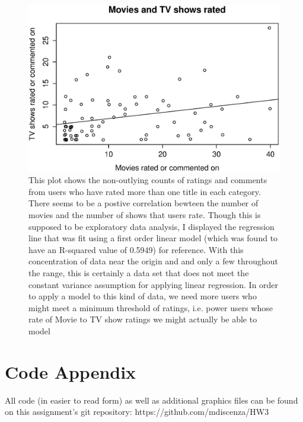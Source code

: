 \documentclass{article}
\begin{document}
\begin{figure}[H]
\begin{center}
\includegraphics[width=1\columnwidth]{getglue2.eps}
\caption{This plot shows the non-outlying counts of ratings and comments from users who have rated more than one title in each category. There seems to be a postive correlation bewteen the number of movies and the number of shows that users rate. Though this is supposed to be exploratory data analysis, I displayed the regression line that was fit using a first order linear model (which was found to have an R-squared value of 0.5949) for reference.  With this concentration of data near the origin and and only a few throughout the range, this is certainly a data set that does not meet the constant variance assumption for applying linear regression.  In order to apply a model to this kind of data, we need more users who might meet a minimum threshold of ratings, i.e. power users whose rate of Movie to TV show ratings we might actually be able to model}
\end{center}
\end{figure}



\section{Code Appendix}
All code (in easier to read form) as well as additional graphics files can be found on this assignment's git repository:
https://github.com/mdiscenza/HW3







\begin{small}

 
\end{small}
\end{document}
